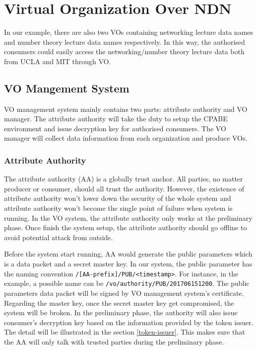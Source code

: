 \section{Virtual Organization Over NDN}

In our example, there are also two VOs containing networking lecture data names and number theory lecture data names respectively.
In this way, the authorised consumers could easily access the networking/number theory lecture data both from UCLA and MIT through VO.

\subsection{VO Mangement System}

VO management system mainly contains two parts: attribute authority and VO manager.
The attribute authority will take the duty to setup the CPABE environment and issue decryption key for authorised consumers.
The VO manager will collect data information from each organization and produce VOs.

\subsubsection{Attribute Authority}
The attribute authority (AA) is a globally trust anchor.
All parties, no matter producer or consumer, should all trust the authority.
However, the existence of attribute authority won't lower down the security of the whole system and attribute authority won't become the single point of failure when system is running.
In the VO system, the attribute authority only works at the preliminary phase.
Once finish the system setup, the attribute authority should go offline to avoid potential attack from outside.

Before the system start running, AA would generate the public parameters which is a data packet and a secret master key.
In our system, the public parameter has the naming convention \texttt{/[AA-prefix]/PUB/<timestamp>}.
For instance, in the example, a possible name can be \texttt{/vo/authority/PUB/201706151200}.
The public parameters data packet will be signed by VO management system's certificate.
Regarding the master key, once the secret master key get compromised, the system will be broken.
In the preliminary phase, the authority will also issue consumer's decryption key based on the information provided by the token issuer.
The detail will be illustrated in the section \ref{token-issuer}.
This makes sure that the AA will only talk with trusted parties during the preliminary phase.

